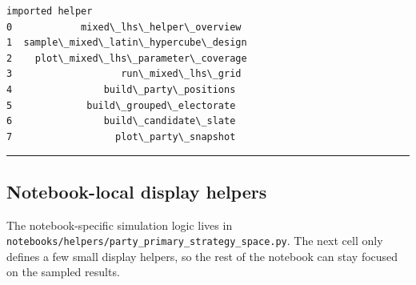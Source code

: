 \documentclass[11pt]{article}
\makeatletter
\newcommand{\boxspacing}{\kern\kvtcb@left@rule\kern\kvtcb@boxsep}
\newcommand{\prompt}[4]{
        {\ttfamily\llap{{\color{#2}[#3]:\hspace{3pt}#4}}\vspace{-\baselineskip}}
    }
\makeatother
\begin{document}
            \begin{tcolorbox}[breakable, size=fbox, boxrule=.5pt, pad at break*=1mm, opacityfill=0]
\prompt{Out}{outcolor}{97}{\boxspacing}
\begin{Verbatim}[commandchars=\\\{\}]
                       imported helper
0            mixed\_lhs\_helper\_overview
1  sample\_mixed\_latin\_hypercube\_design
2    plot\_mixed\_lhs\_parameter\_coverage
3                   run\_mixed\_lhs\_grid
4                build\_party\_positions
5             build\_grouped\_electorate
6                build\_candidate\_slate
7                  plot\_party\_snapshot
\end{Verbatim}
\end{tcolorbox}
        
    \begin{center}\rule{0.5\linewidth}{0.5pt}\end{center}

\subsection{Notebook-local display
helpers}\label{notebook-local-display-helpers}

The notebook-specific simulation logic lives in
\texttt{notebooks/helpers/party\_primary\_strategy\_space.py}. The next
cell only defines a few small display helpers, so the rest of the
notebook can stay focused on the sampled results.
\end{document}
